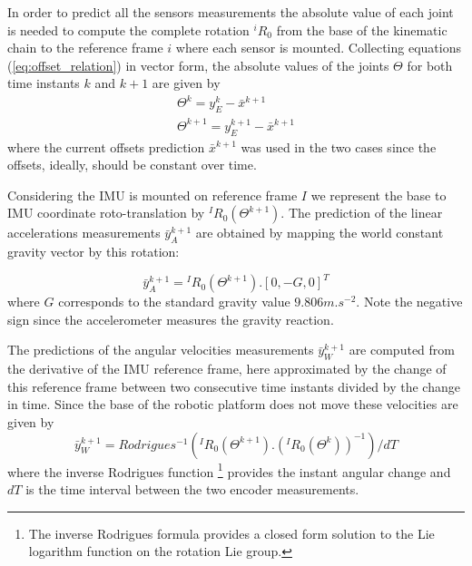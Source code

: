 In order to predict all the sensors measurements the absolute value of each joint is needed to compute the complete rotation $^iR_0$ from the base of the kinematic chain to the reference frame $i$ where each sensor is mounted. Collecting equations (\ref{eq:offset_relation}) in vector form, the absolute values of the joints $\Theta$ for both time instants $k$ and $k+1$ are given by
\begin{equation}
\begin{array}{c}
\Theta^{k}=y_{E}^{k}-\bar{x}^{k+1}\\
\Theta^{k+1}=y_{E}^{k+1}-\bar{x}^{k+1}
\end{array}
\label{Eq:Encoders_real}
\end{equation}
where the current offsets prediction $\bar{x}^{k+1}$ was used in the two cases since the offsets, ideally, should be constant over time.

Considering the IMU is mounted on reference frame $I$ we represent the base to IMU coordinate roto-translation by $^{I}R_{0}\left(\Theta^{k+1}\right)$. The prediction of the linear accelerations measurements $\bar{y}_{A}^{k+1}$ are obtained by mapping the world constant gravity vector by this rotation: 

\begin{equation}
\bar{y}_{A}^{k+1}={}^{I}R_{0}\left(\Theta^{k+1}\right).\left[0,-G,0\right]^{T}
\label{eq: za_pred}
\end{equation}
where $G$ corresponds to the standard gravity value $9.806m.s^{-2}$. Note the negative sign since the accelerometer measures the gravity reaction.

The predictions of the angular velocities measurements $\bar{y}_{W}^{k+1}$ are computed from the derivative of the IMU reference frame, here approximated by the change of this reference frame between two consecutive time instants divided by the change in time. Since the base of the robotic platform does not move these velocities are given by
\begin{equation}
\bar{y}_{W}^{k+1}=Rodrigues^{-1}\left(^{I}R_{0}\left(\Theta^{k+1}\right).\left(^{I}R_{0}\left(\Theta^{k}\right)\right)^{-1}\right)/dT
\label{eq: zw_pred}
\end{equation}
where the inverse Rodrigues function \footnote{The inverse Rodrigues formula provides a closed form solution to the Lie logarithm function on the rotation Lie group.} \cite{Rodrigues40} provides the instant angular change and $dT$ is the time interval between the two encoder measurements.


